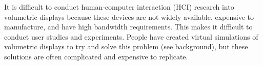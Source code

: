 \begin{invisBox}
\hfill
{}
\end{invisBox}

It is difficult to conduct human-computer interaction (HCI) research into volumetric displays because these devices are not widely available, expensive to manufacture, and have high bandwidth requirements. This makes it difficult to conduct user studies and experiments. People have created virtual simulations of volumetric displays to try and solve this problem (see background), but these solutions are often complicated and expensive to replicate.

